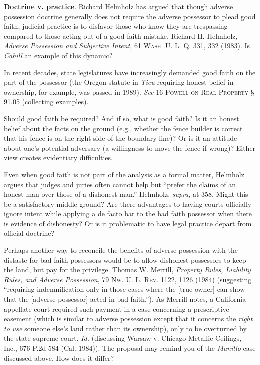 \item \textbf{Doctrine v. practice}. Richard Helmholz has argued that
though adverse possession doctrine generally does not require the adverse
possessor to plead good faith, judicial practice is to disfavor those who know
they are trespassing compared to those acting out of a good faith mistake.
Richard H. Helmholz, \textit{Adverse Possession and Subjective Intent}, 61
\textsc{Wash. U. L. Q.} 331, 332 (1983). Is \textit{Cahill} an example of this
dynamic? 


In recent decades, state legislatures have increasingly demanded good faith on
the part of the possessor (the Oregon statute in \textit{Tieu} requiring honest
belief in ownership, for example, was passed in 1989). \textit{See} 16
\textsc{Powell on Real Property} {\S} 91.05 (collecting examples).

\item Should good faith be required? And if so, what is good faith? Is it an
honest belief about the facts on the ground (e.g., whether the fence builder is
correct that his fence is on the right side of the boundary line)? Or is it an
attitude about one's potential adversary (a willingness to move the fence if
wrong)? Either view creates evidentiary difficulties. 

Even when good faith is not part of the analysis as a formal matter, Helmholz
argues that judges and juries often cannot help but ``prefer the claims of an
honest man over those of a dishonest man.'' Helmholz, \textit{supra}, at 358.
Might this be a satisfactory middle ground? Are there advantages to having
courts officially ignore intent while applying a de facto bar to the bad faith
possessor when there is evidence of dishonesty? Or is it problematic to have
legal practice depart from official doctrine? 

Perhaps another way to reconcile the benefits of adverse possession with the
distaste for bad faith possessors would be to allow dishonest possessors to
keep the land, but pay for the privilege. Thomas W. Merrill, \textit{Property
Rules, Liability Rules, and Adverse Possession}, 79 \textsc{Nw. U. L. Rev}.
1122, 1126 (1984) (suggesting ``requiring indemnification only in those cases
where the [true owner] can show that the [adverse possessor] acted in bad
faith.''). As Merrill notes, a California appellate court required
such payment in a case concerning a prescriptive easement (which is similar to
adverse possession except that it concerns the \textit{right to use} someone
else's land rather than its ownership), only to be overturned by the state
supreme court. \textit{Id.} (discussing Warsaw v. Chicago Metallic Ceilings,
Inc., 676 P.2d 584 (Cal. 1984)). The proposal may remind you of the
\textit{Manillo} case discussed above. How does it differ? 

